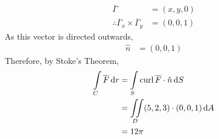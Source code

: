 \documentclass[fleqn, a4paper, 12pt, twoside]{article}
\theoremstyle{definition}
\theoremstyle{theorem}
\newcommand{\curl}{\mathrm{curl\,}}
\begin{document}
\begin{solution}
\begin{align*}
		\overline{\Gamma}                                          & = (x,y,0) \\
		\therefore \overline{\Gamma}_x \times \overline{\Gamma}_y & = (0,0,1)
	\end{align*}
	As this vector is directed outwards,
	\begin{align*}
		\hat{n} & = (0,0,1)
	\end{align*}
	Therefore, by Stoke's Theorem,
	\begin{align*}
		\int\limits_{C} \overline{F} \dif r & = \int\limits_{S} \curl \overline{F} \cdot \hat{n} \dif S \\
                                                    & = \iint\limits_{D} (5,2,3) \cdot (0,0,1) \dif A \\
                                                    & = 12 \pi
	\end{align*}
\end{solution}
\end{document}
